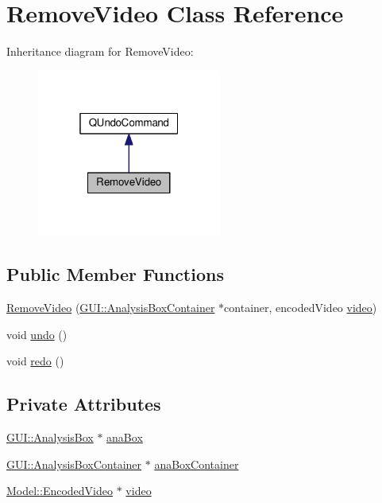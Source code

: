 \hypertarget{classUndoRedo_1_1RemoveVideo}{}\section{Remove\+Video Class Reference}
\label{classUndoRedo_1_1RemoveVideo}


Inheritance diagram for Remove\+Video\+:
\nopagebreak
\begin{figure}[H]
\begin{center}
\leavevmode
\includegraphics[width=172pt]{classUndoRedo_1_1RemoveVideo__inherit__graph}
\end{center}
\end{figure}
\subsection*{Public Member Functions}
\begin{DoxyCompactItemize}
\item 
\hyperlink{classUndoRedo_1_1RemoveVideo_acb8f85461d6666ff4af154b6018c4cf3}{Remove\+Video} (\hyperlink{classGUI_1_1AnalysisBoxContainer}{G\+U\+I\+::\+Analysis\+Box\+Container} $\ast$container, encoded\+Video \hyperlink{classUndoRedo_1_1RemoveVideo_a226620d1252c162814ca98d3e522255c}{video})
\item 
void \hyperlink{classUndoRedo_1_1RemoveVideo_a0e1e7804a53f6d62efc72c9bdbec8571}{undo} ()
\item 
void \hyperlink{classUndoRedo_1_1RemoveVideo_a93c48d6ed036e1a381be53ac67643284}{redo} ()
\end{DoxyCompactItemize}
\subsection*{Private Attributes}
\begin{DoxyCompactItemize}
\item 
\hyperlink{classGUI_1_1AnalysisBox}{G\+U\+I\+::\+Analysis\+Box} $\ast$ \hyperlink{classUndoRedo_1_1RemoveVideo_a574e9e2f540b9068b64a7f26cb40b20a}{ana\+Box}
\item 
\hyperlink{classGUI_1_1AnalysisBoxContainer}{G\+U\+I\+::\+Analysis\+Box\+Container} $\ast$ \hyperlink{classUndoRedo_1_1RemoveVideo_a69c99d1253a1b743455a030de5a733cb}{ana\+Box\+Container}
\item 
\hyperlink{classModel_1_1EncodedVideo}{Model\+::\+Encoded\+Video} $\ast$ \hyperlink{classUndoRedo_1_1RemoveVideo_a226620d1252c162814ca98d3e522255c}{video}
\end{DoxyCompactItemize}


